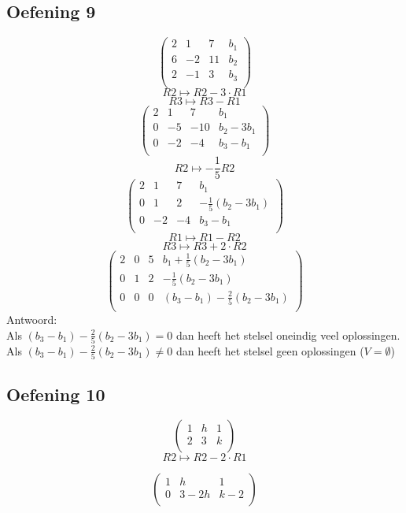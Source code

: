 \documentclass[lineaire_algebra_oplossingen.tex]{subfiles}
\begin{document}
\subsection{Oefening 9}
\[
\begin{pmatrix}
2 &  1 &  7 & b_1\\
6 & -2 & 11 & b_2 \\
2 & -1 &  3 & b_3\\
\end{pmatrix}
\]
\[ R2 \longmapsto R2 -3\cdot R1\]
\[ R3 \longmapsto R3 - R1\]
\[
\begin{pmatrix}
2 &  1 &  7 & b_1\\
0 & -5 & -10& b_2-3b_1 \\
0 & -2 &  -4& b_3-b_1\\
\end{pmatrix}
\]
\[ R2 \longmapsto -\frac{1}{5} R2\]
\[
\begin{pmatrix}
2 &  1 &  7 & b_1\\
0 &  1 &  2 & -\frac{1}{5}(b_2-3b_1) \\
0 & -2 &  -4& b_3-b_1\\
\end{pmatrix}
\]
\[ R1 \longmapsto R1 - R2\]
\[ R3 \longmapsto R3 + 2 \cdot	R2\]
\[
\begin{pmatrix}
2 &  0 &  5 & b_1 + \frac{1}{5}(b_2-3b_1)\\
0 &  1 &  2 & -\frac{1}{5}(b_2-3b_1) \\
0 &  0 &  0 & (b_3-b_1) - \frac{2}{5}(b_2-3b_1)\\
\end{pmatrix}
\]
Antwoord:\\
Als $(b_3-b_1) - \frac{2}{5}(b_2-3b_1) = 0$ dan heeft het stelsel oneindig veel oplossingen.
Als $(b_3-b_1) - \frac{2}{5}(b_2-3b_1) \neq 0$ dan heeft het stelsel geen oplossingen ($V=\emptyset$)

\subsection{Oefening 10}
\[
\begin{pmatrix}
1 & h & 1\\
2 & 3 & k\\
\end{pmatrix}
\]
\[ R2 \longmapsto R2 - 2 \cdot R1\]

\[
\begin{pmatrix}
1 & h & 1\\
0 & 3-2h & k-2\\
\end{pmatrix}
\]
\end{document}
